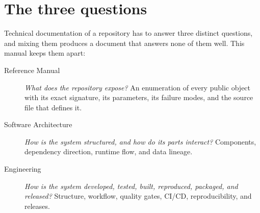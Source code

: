 
\section*{The three questions}

Technical documentation of a repository has to answer three distinct
questions, and mixing them produces a document that answers none of them well.
This manual keeps them apart:

\begin{description}
  \item[Reference Manual] \emph{What does the repository expose?} An
    enumeration of every public object with its exact signature, its
    parameters, its failure modes, and the source file that defines it.
  \item[Software Architecture] \emph{How is the system structured, and how do
    its parts interact?} Components, dependency direction, runtime flow, and
    data lineage.
  \item[Engineering] \emph{How is the system developed, tested, built,
    reproduced, packaged, and released?} Structure, workflow, quality gates,
    CI/CD, reproducibility, and releases.
\end{description}

